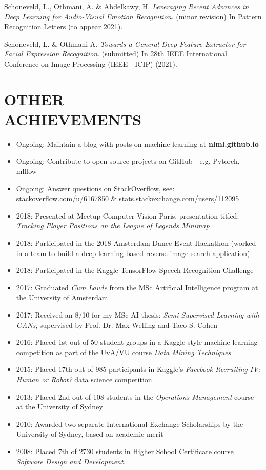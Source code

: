 \documentclass[margin]{res}
\begin{document}
\begin{resume}
		Schoneveld, L., Othmani, A. \& Abdelkawy, H. \textit{Leveraging Recent Advances in Deep Learning for Audio-Visual Emotion Recognition}. (minor revision) In Pattern Recognition Letters (to appear 2021). 
		
		Schoneveld, L. \& Othmani A. 
		\textit{Towards a General Deep Feature Extractor for Facial Expression Recognition}. (submitted) In 28th IEEE International Conference on Image Processing (IEEE - ICIP) (2021).
		
		\section{OTHER \\ ACHIEVEMENTS}
		
		\begin{itemize}
			\item Ongoing: Maintain a blog with posts on machine learning at \textbf{nlml.github.io}
			\item Ongoing: Contribute to open source projects on GitHub - e.g. Pytorch, mlflow
			\item Ongoing: Answer questions on StackOverflow, see:\\stackoverflow.com/u/6167850 \& stats.stackexchange.com/users/112095
			\item 2018: Presented at Meetup Computer Vision Paris, presentation titled:\\ \emph{Tracking Player Positions on the League of Legends Minimap}
			\item 2018: Participated in the 2018 Amsterdam Dance Event Hackathon (worked in a team to build a deep learning-based reverse image search application)
			\item 2018: Participated in the Kaggle TensorFlow Speech Recognition Challenge
			\item 2017: Graduated {\it Cum Laude} from the MSc Artificial Intelligence program at the University of Amsterdam
			\item 2017: Received an 8/10 for my MSc AI thesis: {\it Semi-Supervised Learning with GANs}, supervised by Prof. Dr. Max Welling and Taco S. Cohen
			\item 2016: Placed 1st out of 50 student groups in a Kaggle-style machine learning competition as part of the UvA/VU course \textit{Data Mining Techniques}
			\item 2015: Placed 17th out of 985 participants in Kaggle's {\sl Facebook Recruiting IV: Human or Robot?} data science competition
			\item 2013: Placed 2nd out of 108 students in the \textit{Operations Management} course at the University of Sydney
			\item 2010: Awarded two separate International Exchange Scholarships by the University of Sydney, based on academic merit
			\item 2008: Placed 7th of 2730 students in Higher School Certificate course {\sl Software Design and Development.}
		\end{itemize}
		

\end{resume}
\end{document}
